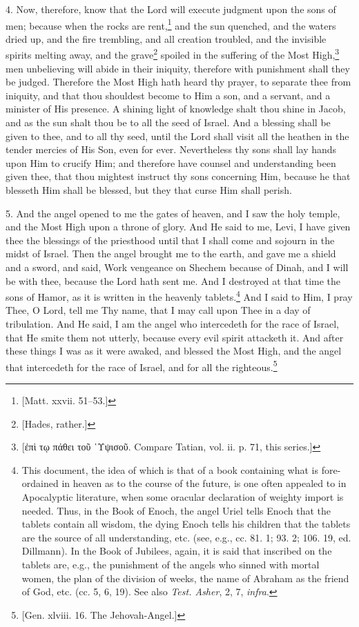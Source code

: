 4. Now, therefore, know that the Lord will execute judgment upon the sons of men; because when the rocks are rent,\footnote{[Matt. xxvii. 51–53.]} and the sun quenched, and the waters dried up, and the fire trembling, and all creation troubled, and the invisible spirits melting away, and the grave\footnote{[Hades, rather.]} spoiled in the suffering of the Most High,\footnote{[\textgreek{ἐπὶ τῳ πάθει τοῦ ῾Υψισοῦ}. Compare Tatian, vol. ii. p. 71, this series.]} men unbelieving will abide in their iniquity, therefore with punishment shall they be judged. Therefore the Most High hath heard thy prayer, to separate thee from iniquity, and that thou shouldest become to Him a son, and a servant, and a minister of His presence. A shining light of knowledge shalt thou shine in Jacob, and as the sun shalt thou be to all the seed of Israel. And a blessing shall be given to thee, and to all thy seed, until the Lord shall visit all the heathen in the tender mercies of His Son, even for ever. Nevertheless thy sons shall lay hands upon Him to crucify Him; and therefore have counsel and understanding been given thee, that thou mightest instruct thy sons concerning Him, because he that blesseth Him shall be blessed, but they that curse Him shall perish.

5. And the angel opened to me the gates of heaven, and I saw the holy temple, and the Most High upon a throne of glory. And He said to me, Levi, I have given thee the blessings of the priesthood until that I shall come and sojourn in the midst of Israel. Then the angel brought me to the earth, and gave me a shield and a sword, and said, Work vengeance on Shechem because of Dinah, and I will be with thee, because the Lord hath sent me. And I destroyed at that time the sons of Hamor, as it is written in the heavenly tablets.\footnote{This document, the idea of which is that of a book containing what is fore-ordained in heaven as to the course of the future, is one often appealed to in Apocalyptic literature, when some oracular declaration of weighty import is needed. Thus, in the Book of Enoch, the angel Uriel tells Enoch that the tablets contain all wisdom, the dying Enoch tells his children that the tablets are the source of all understanding, etc. (see, e.g., cc. 81. 1; 93. 2; 106. 19, ed. Dillmann). In the Book of Jubilees, again, it is said that inscribed on the tablets are, e.g., the punishment of the angels who sinned with mortal women, the plan of the division of weeks, the name of Abraham as the friend of God, etc. (cc. 5, 6, 19). See also \emph{Test. Asher}, 2, 7, \emph{infra}.} And I said to Him, I pray Thee, O Lord, tell me Thy name, that I may call upon Thee in a day of tribulation. And He said, I am the angel who intercedeth for the race of Israel, that He smite them not utterly, because every evil spirit attacketh it. And after these things I was as it were awaked, and blessed the Most High, and the angel that intercedeth for the race of Israel, and for all the righteous.\footnote{[Gen. xlviii. 16. The Jehovah-Angel.]}

